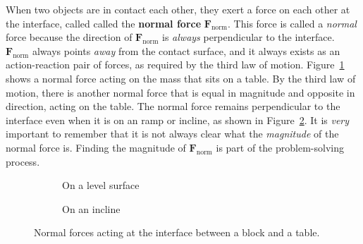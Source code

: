 When two objects are in contact each other, they exert a force on each other at
the interface, called called the \textbf{normal force} $\bm F_\text{norm}$.
This force is called a \emph{normal} force because the direction of
$\bm F_\text{norm}$ is \emph{always} perpendicular to the interface.
$\bm F_\text{norm}$ always points \emph{away} from the contact surface, and it
always exists as an action-reaction pair of forces, as required by the third
law of motion. Figure~\ref{fig:normal-force1} shows a normal force acting on
the mass that sits on a table. By the third law of motion, there is another
normal force that is equal in magnitude and opposite in direction, acting on
the table. The normal force remains perpendicular to the interface even when
it is on an ramp or incline, as shown in Figure~\ref{fig:normal-force-ramp}.
It is \emph{very} important to remember that it is not always clear what the
\emph{magnitude} of the normal force is. Finding the magnitude of
$\bm F_\text{norm}$ is part of the problem-solving process.
\begin{figure}[ht]
  \centering
  \begin{subfigure}{.4\linewidth}
    \centering
    \caption{On a level surface}
    \label{fig:normal-force1}
  \end{subfigure}
  \hspace{.2in}
  \begin{subfigure}{.4\linewidth}
    \centering
    \caption{On an incline}
    \label{fig:normal-force-ramp}
  \end{subfigure}
  \caption{Normal forces acting at the interface between a block and a table.}
  \label{fig:normal}
\end{figure}

